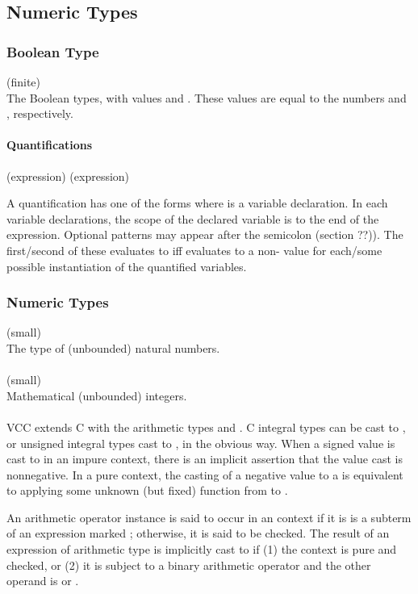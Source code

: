 \documentclass[preprint,nocopyrightspace]{sigplanconf}
\newcommand{\subsubsubsection}[1]{\paragraph{#1}}
\begin{document}
{{\subsection{Numeric Types}

\subsubsection{Boolean Type}

\vcc{\bool} (finite)\\
The Boolean types, with values \vcc{\true} and \vcc{\false}. These
values are equal to the \vcc{\natural} numbers  and , respectively.

\subsubsubsection{Quantifications}

 (expression)
 (expression)

A quantification has one of the forms
where  is a variable declaration. In each variable
declarations, the scope of the declared variable is to the end of the
expression. Optional patterns may appear after the semicolon
(section ??)). 
The first/second of these evaluates to 
\vcc{\true} iff  evaluates to a non-\vcc{\false} value for
each/some possible instantiation of the quantified variables.

\subsubsection{Numeric Types}

\vcc{\natural} (small)\\
The type of (unbounded) natural numbers. 
\\\\
\vcc{\integer} (small)\\
Mathematical (unbounded) integers. 
\\\\
VCC extends C with the arithmetic types \vcc{\natural}
and \vcc{\integer}. C integral types can be cast to \vcc{\integer},
or unsigned integral types cast to \vcc{\natural}, in the obvious
way. When a signed value is cast to \vcc{\natural} in an impure
context, there is an implicit assertion that the value cast is
nonnegative. In a pure context, the casting of a negative value to 
a \vcc{\natural} is equivalent to applying some unknown (but fixed)
function from  to . 

An arithmetic operator instance is said to occur in
an \vcc{\unchecked} context if it is is a subterm of an expression
marked ; otherwise, it is said to be checked. The
result of an expression of arithmetic type is implicitly cast
to \vcc{\integer} if (1) the context is pure and checked, or (2) it is
subject to a binary arithmetic operator and the other operand
is \vcc{\natural} or \vcc{\integer}.

}}
\end{document}
